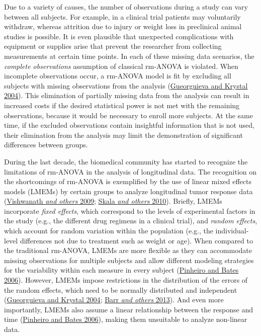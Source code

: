 \documentclass[
]{article}
\begin{document}
Due to a variety of causes, the number of observations during a study can vary between all subjects. For example, in a clinical trial patients may voluntarily withdraw, whereas attrition due to injury or weight loss in preclinical animal studies is possible. It is even plausible that unexpected complications with equipment or supplies arise that prevent the researcher from collecting measurements at certain time points. In each of these missing data scenarios, the \emph{complete observations} assumption of classical rm-ANOVA is violated. When incomplete observations occur, a rm-ANOVA model is fit by excluding all subjects with missing observations from the analysis (\protect\hyperlink{ref-gueorguieva2004}{Gueorguieva and Krystal 2004}). This elimination of partially missing data from the analysis can result in increased costs if the desired statistical power is not met with the remaining observations, because it would be necessary to enroll more subjects. At the same time, if the excluded observations contain insightful information that is not used, their elimination from the analysis may limit the demonstration of significant differences between groups.

During the last decade, the biomedical community has started to recognize the limitations of rm-ANOVA in the analysis of longitudinal data. The recognition on the shortcomings of rm-ANOVA is exemplified by the use of linear mixed effects models (LMEMs) by certain groups to analyze longitudinal tumor response data (\protect\hyperlink{ref-vishwanath2009}{Vishwanath \emph{and others} 2009}; \protect\hyperlink{ref-skala2010}{Skala \emph{and others} 2010}). Briefly, LMEMs incorporate \emph{fixed effects}, which correspond to the levels of experimental factors in the study (e.g., the different drug regimens in a clinical trial), and \emph{random effects}, which account for random variation within the population (e.g., the individual-level differences not due to treatment such as weight or age). When compared to the traditional rm-ANOVA, LMEMs are more flexible as they can accommodate missing observations for multiple subjects and allow different modeling strategies for the variability within each measure in every subject (\protect\hyperlink{ref-pinheiro2006}{Pinheiro and Bates 2006}). However, LMEMs impose restrictions in the distribution of the errors of the random effects, which need to be normally distributed and independent (\protect\hyperlink{ref-gueorguieva2004}{Gueorguieva and Krystal 2004}; \protect\hyperlink{ref-barr2013}{Barr \emph{and others} 2013}). And even more importantly, LMEMs also assume a linear relationship between the response and time (\protect\hyperlink{ref-pinheiro2006}{Pinheiro and Bates 2006}), making them unsuitable to analyze non-linear data.
\end{document}
